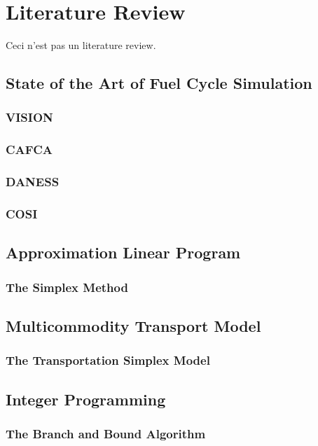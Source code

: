 \chapter{Literature Review}\label{ch:litreview}

Ceci n'est pas un literature review. 

\section{State of the Art of Fuel Cycle Simulation}

\subsection{VISION}
\subsection{CAFCA}
\subsection{DANESS}
\subsection{COSI}

\section{Approximation Linear Program}

\subsection{The Simplex Method}

\section{Multicommodity Transport Model}

\subsection{The Transportation Simplex Model}

\section{Integer Programming}

\subsection{The Branch and Bound Algorithm}
